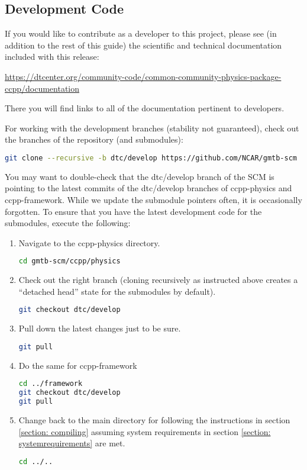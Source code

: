 \subsection{Development Code}
\label{section: development_code}

If you would like to contribute as a developer to this project, please see (in addition to the rest of this guide) the scientific and technical documentation included with this release:

\url{https://dtcenter.org/community-code/common-community-physics-package-ccpp/documentation}

There you will find links to all of the documentation pertinent to developers.

For working with the development branches (stability not guaranteed), check out the  branches of the repository (and submodules):
\begin{lstlisting}[language=bash]
git clone --recursive -b dtc/develop https://github.com/NCAR/gmtb-scm
\end{lstlisting}
You may want to double-check that the dtc/develop branch of the SCM is pointing to the latest commits of the dtc/develop branches of ccpp-physics and ccpp-framework. While we update the submodule pointers often, it is occasionally forgotten. To ensure that you have the latest development code for the submodules, execute the following:
\begin{enumerate}
\item Navigate to the ccpp-physics directory.
\begin{lstlisting}[language=bash]
cd gmtb-scm/ccpp/physics
\end{lstlisting}
\item Check out the right branch (cloning recursively as instructed above creates a ``detached head'' state for the submodules by default).
\begin{lstlisting}[language=bash]
git checkout dtc/develop
\end{lstlisting}
\item Pull down the latest changes just to be sure.
\begin{lstlisting}[language=bash]
git pull
\end{lstlisting}
\item Do the same for ccpp-framework
\begin{lstlisting}[language=bash]
cd ../framework
git checkout dtc/develop
git pull
\end{lstlisting}
\item Change back to the main directory for following the instructions in section \ref{section: compiling} assuming system requirements in section \ref{section: systemrequirements} are met.
\begin{lstlisting}[language=bash]
cd ../..
\end{lstlisting}
\end{enumerate}


